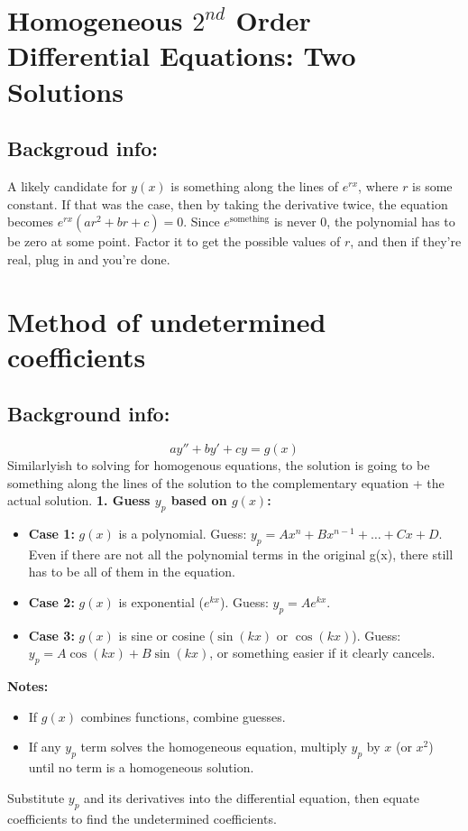 \documentclass{article}
\begin{document}
\hypertarget{twoSolutions}{
    \section*{Homogeneous $2^{nd}$ Order Differential Equations: Two Solutions}
    \subsection*{Backgroud info:}
 	  A likely candidate for $y(x)$ is something along the lines of $e^{rx}$, where $r$ is some constant. If that was the case, then by taking the derivative twice, the equation becomes $e^{rx}(ar^2 + br + c) = 0$. Since $e^{\text{something}}$ is never 0, the polynomial has to be zero at some point. Factor it to get the possible values of $r$, and then if they're real, plug in and you're done.
}
\hypertarget{undeterminedcoefficients}{
    \section*{Method of undetermined coefficients}
    \subsection*{Background info:}
		\begin{equation*}
		ay'' + by' + cy = g(x)
		\end{equation*}
		Similarlyish to solving for homogenous equations, the solution is going to be something along the lines of the solution to the complementary equation + the actual solution.
		\textbf{1. Guess $y_p$ based on $g(x)$:}
		\begin{itemize}
		  \item \textbf{Case 1:} $g(x)$ is a polynomial. 
		    Guess: $y_p = Ax^n + Bx^{n-1} + \dots + Cx + D$.
		    Even if there are not all the polynomial terms in the original g(x), there still has to be all of them in the equation.
		  \item \textbf{Case 2:} $g(x)$ is exponential ($e^{kx}$). 
		    Guess: $y_p = Ae^{kx}$.
		  \item \textbf{Case 3:} $g(x)$ is sine or cosine ($\sin(kx)$ or $\cos(kx)$). 
		    Guess: $y_p = A\cos(kx) + B\sin(kx)$, or something easier if it clearly cancels.
		\end{itemize}
		\textbf{Notes:}
		\begin{itemize}
		  \item If $g(x)$ combines functions, combine guesses.
		  \item If any $y_p$ term solves the homogeneous equation, multiply $y_p$ by $x$ (or $x^2$) until no term is a homogeneous solution.
		\end{itemize}
		Substitute $y_p$ and its derivatives into the differential equation, then equate coefficients to find the undetermined coefficients.
}
\end{document}
